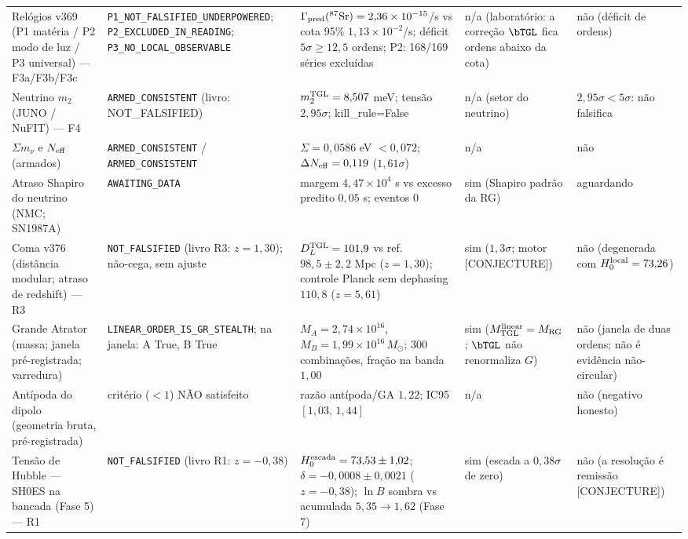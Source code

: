 \begin{footnotesize}
\begin{longtable}{@{}p{}p{}p{}p{}p{}@{}}
Relógios v369 (P1 matéria / P2 modo de luz / P3 universal) --- F3a/F3b/F3c & \texttt{P1\_\allowbreak{}NOT\_\allowbreak{}FALSIFIED\_\allowbreak{}UNDERPOWERED}; \texttt{P2\_\allowbreak{}EXCLUDED\_\allowbreak{}IN\_\allowbreak{}READING}; \texttt{P3\_\allowbreak{}NO\_\allowbreak{}LOCAL\_\allowbreak{}OBSERVABLE} & $\Gamma_{\rm pred}(^{87}\mathrm{Sr})=2{,}36\times10^{-15}$/s vs cota 95\% $1{,}13\times10^{-2}$/s; déficit $5\sigma\geq12{,}5$ ordens; P2: 168/169 séries excluídas & n/a (laboratório: a correção $\bTGL$ fica ordens abaixo da cota) & não (déficit de ordens) \\
Neutrino $m_2$ (JUNO / NuFIT) --- F4 & \texttt{ARMED\_\allowbreak{}CONSISTENT} (livro: NOT\_FALSIFIED) & $m_2^{\rm TGL}=8{,}507$ meV; tensão $2{,}95\sigma$; kill\_rule=False & n/a (setor do neutrino) & $2{,}95\sigma<5\sigma$: não falsifica \\
$\Sigma m_\nu$ e $N_{\rm eff}$ (armados) & \texttt{ARMED\_\allowbreak{}CONSISTENT} / \texttt{ARMED\_\allowbreak{}CONSISTENT} & $\Sigma=0{,}0586$ eV $<0{,}072$; $\Delta N_{\rm eff}=0{,}119$ ($1{,}61\sigma$) & n/a & não \\
Atraso Shapiro do neutrino (NMC; SN1987A) & \texttt{AWAITING\_\allowbreak{}DATA} & margem $4{,}47\times10^{4}$ s vs excesso predito $0{,}05$ s; eventos 0 & sim (Shapiro padrão da RG) & aguardando \\
Coma v376 (distância modular; atraso de redshift) --- R3 & \texttt{NOT\_\allowbreak{}FALSIFIED} (livro R3: $z=1{,}30$); não-cega, sem ajuste & $D_L^{\rm TGL}=101{,}9$ vs ref.\ $98{,}5\pm2{,}2$ Mpc ($z=1{,}30$); controle Planck sem dephasing $110{,}8$ ($z=5{,}61$) & sim ($1{,}3\sigma$; motor \textsf{[CONJECTURE]}) & não (degenerada com $H_0^{\rm local}=73{,}26$) \\
Grande Atrator (massa; janela pré-registrada; varredura) & \texttt{LINEAR\_\allowbreak{}ORDER\_\allowbreak{}IS\_\allowbreak{}GR\_\allowbreak{}STEALTH}; na janela: A True, B True & $M_A=2{,}74\times10^{16}$, $M_B=1{,}99\times10^{16}\,M_\odot$; 300 combinações, fração na banda $1{,}00$ & sim ($M^{\rm linear}_{\rm TGL}=M_{\rm RG}$; $\bTGL$ não renormaliza $G$) & não (janela de duas ordens; não é evidência não-circular) \\
Antípoda do dipolo (geometria bruta, pré-registrada) & critério ($<1$) NÃO satisfeito & razão antípoda/GA $1{,}22$; IC95 $[1{,}03,\,1{,}44]$ & n/a & não (negativo honesto) \\
Tensão de Hubble --- SH0ES na bancada (Fase 5) --- R1 & \texttt{NOT\_\allowbreak{}FALSIFIED} (livro R1: $z=-0{,}38$) & $H_0^{\rm escada}=73{,}53\pm1{,}02$; $\delta=-0{,}0008\pm0{,}0021$ ($z=-0{,}38$); $\ln B$ sombra vs acumulada $5{,}35\to1{,}62$ (Fase 7) & sim (escada a $0{,}38\sigma$ de zero) & não (a resolução é remissão \textsf{[CONJECTURE]}) \\

\end{longtable}
\end{footnotesize}
